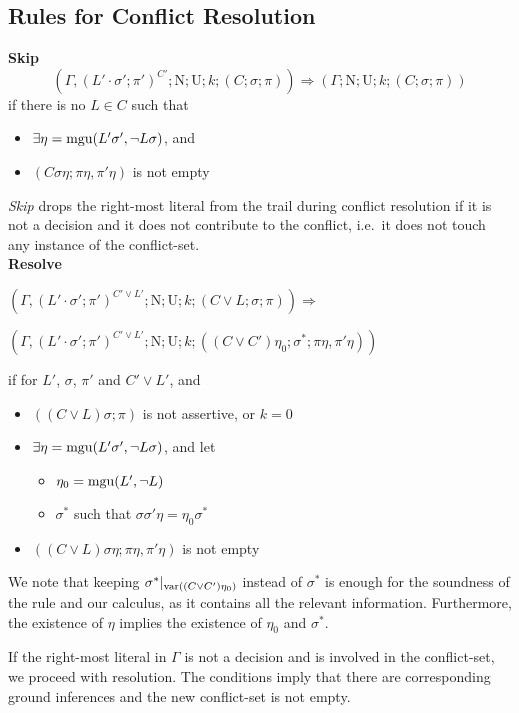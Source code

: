 \documentclass[a4paper]{article}
\newcommand{\leaveabit}{\\[6 pt]}
\begin{document}
\subsection{Rules for Conflict Resolution}
\textbf{Skip}
\[(\Gamma, (L'\cdot\sigma'; \pi')^{C'}; \text{N}; \text{U}; k; (C; \sigma; \pi)) \Rightarrow
    (\Gamma; \text{N}; \text{U}; k; (C; \sigma; \pi))\]
if there is no $L \in C$ such that
\begin{itemize}
	\item $\exists \eta = \operatorname{mgu}(L'\sigma', \neg L\sigma)$, and
	\item $(C\sigma\eta; \pi\eta, \pi'\eta)$ is not empty
\end{itemize}
\emph{Skip} drops the right-most literal from the trail during conflict resolution 
if it is not a decision and it does not contribute to the conflict, i.e.\ 
it does not touch any instance of the conflict-set.\leaveabit
\textbf{Resolve}
\begin{flushleft}$(\Gamma, (L'\cdot\sigma'; \pi')^{C' \lor L'}; \text{N}; \text{U}; k; (C \lor L; \sigma; \pi)) \Rightarrow$\end{flushleft}
  \begin{flushright} $(\Gamma, (L'\cdot\sigma'; \pi')^{C' \lor L'}; \text{N}; \text{U}; k; ((C \lor C')\eta_0; \sigma^*; \pi\eta, \pi'\eta))$\end{flushright}
if for $L'$, $\sigma$, $\pi'$ and $C' \lor L'$, and
\begin{itemize}
	\item $((C\lor L)\sigma; \pi)$ is not assertive, or $k = 0$
	\item $\exists \eta = \operatorname{mgu}(L'\sigma', \neg L\sigma)$, and let
		\begin{itemize}
			\item $\eta_0 = \operatorname{mgu}(L', \neg L)$
			\item $\sigma^*$ such that $\sigma\sigma'\eta = \eta_0\sigma^*$
		\end{itemize}
	\item $((C\lor L)\sigma\eta; \pi\eta, \pi'\eta)$ is not empty
\end{itemize}
We note that keeping $\sigma^*|_{\operatorname{var}((C \lor C')\eta_0)}$ instead of $\sigma^*$ is enough
for the soundness of the rule and our calculus, as it contains all the relevant information.
Furthermore, the existence of $\eta$ implies the existence of $\eta_0$ and $\sigma^*$.

If the right-most literal in $\Gamma$ is not a decision and is involved in the conflict-set, we proceed with 
resolution. The conditions imply that there are corresponding ground inferences and the new conflict-set 
is not empty.
\end{document}
